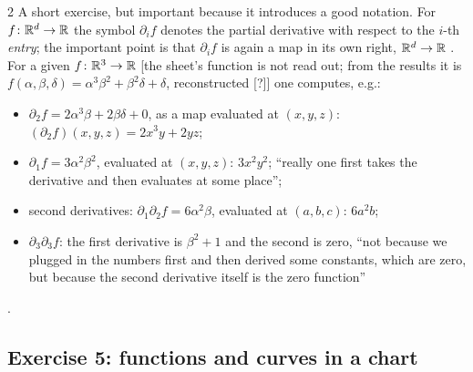 \begin{paracol}{2}
A short exercise, but important because it introduces a good notation. For $f\colon\mathbb{R}^d\to\mathbb{R}$ the symbol $\partial_if$ denotes the partial derivative with respect to the $i$-th \emph{entry}; the important point is that $\partial_if$ is again a map in its own right, $\mathbb{R}^d\to\mathbb{R}$
. For a given $f\colon\mathbb{R}^3\to\mathbb{R}$ [the sheet's function is not read out; from the results it is $f(\alpha,\beta,\delta)=\alpha^3\beta^2+\beta^2\delta+\delta$, reconstructed [?]] one computes, e.g.:
\begin{itemize}
  \item $\partial_2f=2\alpha^3\beta+2\beta\delta+0$, as a map evaluated at $(x,y,z)$: $(\partial_2f)(x,y,z)=2x^3y+2yz$;
  \item $\partial_1f=3\alpha^2\beta^2$, evaluated at $(x,y,z)$: $3x^2y^2$; ``really one first takes the derivative and then evaluates at some place'';
  \item second derivatives: $\partial_1\partial_2f=6\alpha^2\beta$, evaluated at $(a,b,c)$: $6a^2b$;
  \item $\partial_3\partial_3f$: the first derivative is $\beta^2+1$ and the second is zero, ``not because we plugged in the numbers first and then derived some constants, which are zero, but because the second derivative itself is the zero function''
\end{itemize}
.

\subsection*{Exercise 5: functions and curves in a chart}


\end{paracol}
